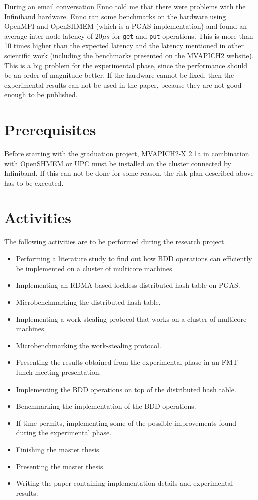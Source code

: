During an email conversation Enno told me that there were problems with the Infiniband hardware. Enno ran some benchmarks on the hardware using OpenMPI and OpenSHMEM (which is a PGAS implementation) and found an average inter-node latency of $20 \mu s$ for \texttt{get} and \texttt{put} operations. This is more than 10 times higher than the expected latency and the latency mentioned in other scientific work (including the benchmarks presented on the MVAPICH2 website). This is a big problem for the experimental phase, since the performance should be an order of magnitude better. If the hardware cannot be fixed, then the experimental results can not be used in the paper, because they are not good enough to be published.

\section{Prerequisites}
Before starting with the graduation project, MVAPICH2-X 2.1a in combination with OpenSHMEM or UPC must be installed on the cluster connected by Infiniband. If this can not be done for some reason, the risk plan described above has to be executed.

\section{Activities}
The following activities are to be performed during the research project.

\begin{itemize}
	\item Performing a literature study to find out how BDD operations can efficiently be implemented on a cluster of multicore machines.
	\item Implementing an RDMA-based lockless distributed hash table on PGAS.
	\item Microbenchmarking the distributed hash table.
	\item Implementing a work stealing protocol that works on a cluster of multicore machines.
	\item Microbenchmarking the work-stealing protocol.
	\item Presenting the results obtained from the experimental phase in an FMT lunch meeting presentation.
	\item Implementing the BDD operations on top of the distributed hash table.
	\item Benchmarking the implementation of the BDD operations.
	\item If time permits, implementing some of the possible improvements found during the experimental phase.
	\item Finishing the master thesis.
	\item Presenting the master thesis.
	\item Writing the paper containing implementation details and experimental results.
\end{itemize}

